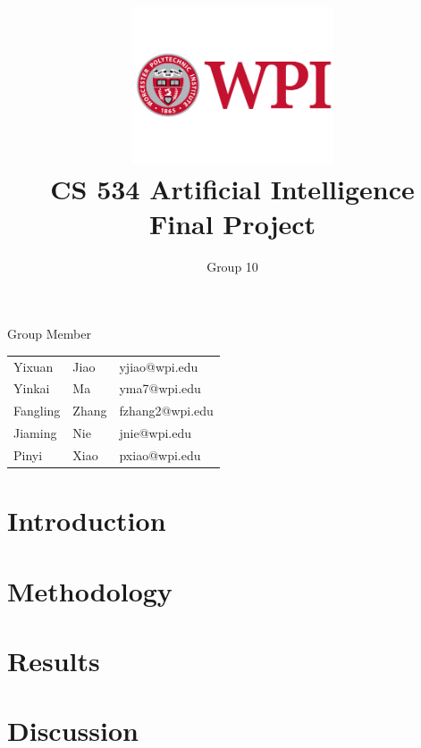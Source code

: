 \documentclass[11pt, a4paper]{article}
\title{\includegraphics[width=0.45\textwidth]{wpi2}
        \\CS 534 Artificial Intelligence \\ Final Project }          %
\author{Group 10 }                    %
\begin{document}
\begin{titlepage}
	
\maketitle
{} %

\begin{center}
Group Member
\end{center}

\begin{table}[htbp] 
\begin{center}
\begin{tabular}{l l l} 
	 
	 
	 Yixuan & Jiao  &   yjiao@wpi.edu \\
     Yinkai & Ma  &   yma7@wpi.edu \\
     Fangling & Zhang  & fzhang2@wpi.edu         \\
     Jiaming & Nie  &  jnie@wpi.edu \\
     Pinyi & Xiao  &  pxiao@wpi.edu \\
\end{tabular}
\end{center}
\end{table}



\thispagestyle{empty}  %

\end{titlepage}



\section{Introduction}

\section{Methodology}

\section{Results}

\section{Discussion}










  
 





\end{document}
